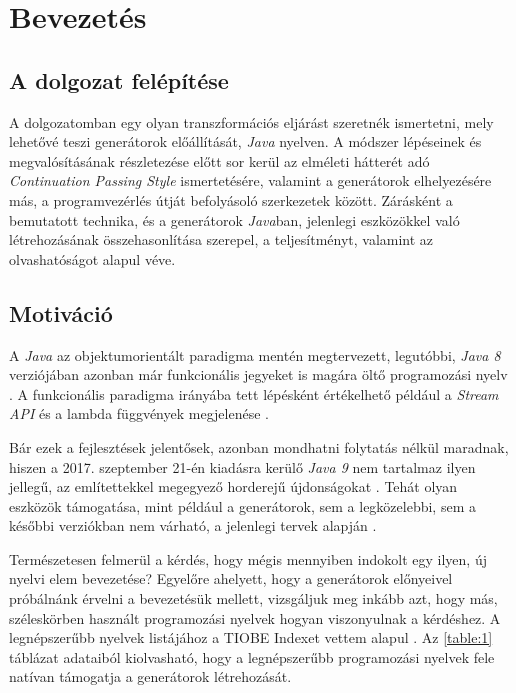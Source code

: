 \chapter{Bevezetés}

\section{A dolgozat felépítése}

A dolgozatomban egy olyan transzformációs eljárást szeretnék ismertetni, mely lehetővé teszi generátorok előállítását, \textit{Java} nyelven. A módszer lépéseinek és megvalósításának részletezése előtt sor kerül az elméleti hátterét adó \textit{Continuation Passing Style} ismertetésére, valamint a generátorok elhelyezésére más, a programvezérlés útját befolyásoló szerkezetek között. Zárásként a bemutatott technika, és a generátorok \textit{Java}ban, jelenlegi eszközökkel való létrehozásának összehasonlítása szerepel, a teljesítményt, valamint az olvashatóságot alapul véve.

\section{Motiváció}

A \textit{Java} az objektumorientált paradigma mentén megtervezett, legutóbbi, \textit{Java 8} verziójában azonban már funkcionális jegyeket is magára öltő programozási nyelv . A funkcionális paradigma irányába tett lépésként értékelhető például a \textit{Stream API} és a lambda függvények megjelenése \cite{Java8Features}. 

Bár ezek a fejlesztések jelentősek, azonban mondhatni folytatás nélkül maradnak, hiszen a 2017. szeptember 21-én kiadásra kerülő \textit{Java 9} nem tartalmaz ilyen jellegű, az említettekkel megegyező horderejű újdonságokat \cite{Java9Features}. Tehát olyan eszközök támogatása, mint például a generátorok, sem a legközelebbi, sem a későbbi verziókban nem várható, a jelenlegi tervek alapján \cite{ProjectValhalla}.

Természetesen felmerül a kérdés, hogy mégis mennyiben indokolt egy ilyen, új nyelvi elem bevezetése? Egyelőre ahelyett, hogy a generátorok előnyeivel próbálnánk érvelni a bevezetésük mellett, vizsgáljuk meg inkább azt, hogy más, széleskörben használt programozási nyelvek hogyan viszonyulnak a kérdéshez. A legnépszerűbb nyelvek listájához a TIOBE Indexet vettem alapul \cite{TIOBEIndex}. Az \ref{table:1} táblázat adataiból kiolvasható, hogy a legnépszerűbb programozási nyelvek fele natívan támogatja a generátorok létrehozását.

